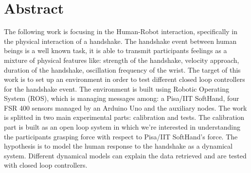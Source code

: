 
\chapter*{Abstract}
\begin{center}

\end{center}
\vspace{60px}
The following work is focusing in the Human-Robot interaction, specifically in the physical interaction of a handshake. The handshake event between human beings is a well known task, it is able to transmit participants feelings as a mixture of physical features like: strength of the handshake, velocity approach, duration of the handshake, oscillation frequency of the wrist.
The target of this work is to set up an environment in order to test different closed loop controllers for the handshake event.
The environment is built using Robotic Operating System (ROS), which is managing messages among: a Pisa/IIT SoftHand, four FSR 400 sensors managed by an Arduino Uno and the auxiliary nodes.
The work is splitted in two main experimental parts: calibration and tests. The calibration part is built as an open loop system in which we're interested in understanding the participants grasping force with respect to Pisa/IIT SoftHand's force. The hypothesis is to model the human response to the handshake as a dynamical system. Different dynamical models can explain the data retrieved and are tested with closed loop controllers.
\\

